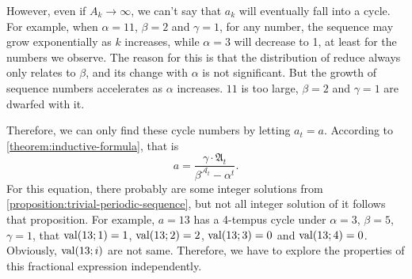 However, even if $A_{k}\to \infty$, we can't say that $a_k$ will eventually fall into a cycle.
For example, when $\alpha = 11$, $\beta = 2$ and $\gamma = 1$, for any number, the sequence may grow exponentially as $k$ increases, while $\alpha = 3$ will decrease to 1, at least for the numbers we observe.
The reason for this is that the distribution of reduce always only relates to $\beta$, and its change with $\alpha$ is not significant.
But the growth of sequence numbers accelerates as $\alpha$ increases. $11$ is too large, $\beta=2$ and $\gamma=1$ are dwarfed with it.

Therefore, we can only find these cycle numbers by letting $a_{t} = a$.
According to \cref{theorem:inductive-formula}, that is
\[ a = \frac{\gamma \cdot \mathfrak{A}_{t}}{\beta^{\mathcal{A}_{t}} - \alpha^{t}}. \]
For this equation, there probably are some integer solutions from \cref{proposition:trivial-periodic-sequence}, but not all integer solution of it follows that proposition.
For example, $a=13$ has a 4-tempus cycle under $\alpha=3$, $\beta=5$, $\gamma=1$, that $\operatorname{val}(13;1) = 1$, $\operatorname{val}(13;2) = 2$, $\operatorname{val}(13;3) = 0$ and $\operatorname{val}(13;4) = 0$.
Obviously, $\operatorname{val}(13;i)$ are not same.
Therefore, we have to explore the properties of this fractional expression independently.
